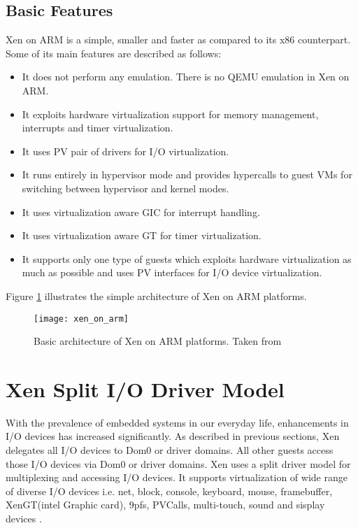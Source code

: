 \subsection{Basic Features\label{sec:xendevice}}
Xen on ARM is a simple, smaller and faster as compared to its x86 counterpart. Some of its main features are described as follows:
\begin{itemize}
	\item It does not perform any emulation. There is no QEMU emulation in Xen on ARM.
	\item It exploits hardware virtualization support for memory management, interrupts and timer virtualization.
	\item It uses PV pair of drivers for I/O virtualization.
	\item It runs entirely in hypervisor mode and provides hypercalls to guest VMs for switching between hypervisor and kernel modes.
	\item It uses virtualization aware GIC for interrupt handling.
	\item It uses virtualization aware GT for timer virtualization.
	\item It supports only one type of guests which exploits hardware virtualization as much as possible and uses PV interfaces for I/O device virtualization.
\end{itemize}

Figure \ref{xen_on_arm} illustrates the simple architecture of Xen on ARM platforms.
\begin{figure}[!htbp]
	\centering
	\texttt{[image: xen\_on\_arm]}
	\caption{Basic architecture of Xen on ARM platforms. Taken from  \cite{xen_arm}}
	\label{xen_on_arm}
\end{figure}

\section{Xen Split I/O Driver Model\label{sec:xensplit}}
With the prevalence of embedded systems in our everyday life, enhancements in I/O devices has increased significantly. As described in previous sections, Xen delegates all I/O devices to  Dom0 or driver domains. All other guests access those I/O devices via Dom0 or driver domains. Xen uses a split driver model for multiplexing and accessing I/O devices. It supports virtualization of wide range of diverse I/O devices i.e. net, block, console, keyboard, mouse, framebuffer, XenGT(intel Graphic
card), 9pfs, PVCalls, multi-touch, sound and sisplay devices \cite{xen_release}.

